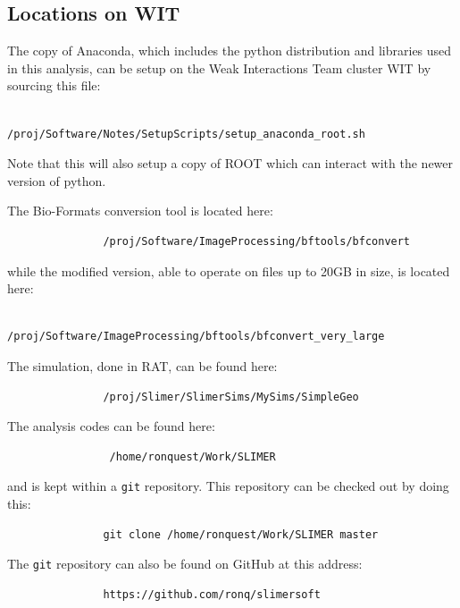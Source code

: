 \documentclass[11pt]{article}
\begin{document}
\subsection{Locations on WIT}
The copy of Anaconda, which includes the python distribution and libraries used in this analysis, can be setup on the Weak Interactions Team cluster WIT by sourcing this file:
\begin{verbatim}
                /proj/Software/Notes/SetupScripts/setup_anaconda_root.sh
\end{verbatim}
Note that this will also setup a copy of ROOT which can interact with the newer version of python. 

The Bio-Formats conversion tool is located here:
\begin{verbatim}
               /proj/Software/ImageProcessing/bftools/bfconvert
\end{verbatim}
while the modified version, able to operate on files up to 20GB in size, is located here:
\begin{verbatim}
               /proj/Software/ImageProcessing/bftools/bfconvert_very_large
\end{verbatim}

The simulation, done in RAT, can be found here:
\begin{verbatim}
               /proj/Slimer/SlimerSims/MySims/SimpleGeo
\end{verbatim}

The analysis codes can be found here:
\begin{verbatim}
                /home/ronquest/Work/SLIMER
\end{verbatim}
and is kept within a \verb+git+ repository. This repository can be checked out by doing this:
\begin{verbatim}
               git clone /home/ronquest/Work/SLIMER master
\end{verbatim}
The \verb+git+ repository can also be found on GitHub at this address:
\begin{verbatim}
               https://github.com/ronq/slimersoft
\end{verbatim}
\end{document}

